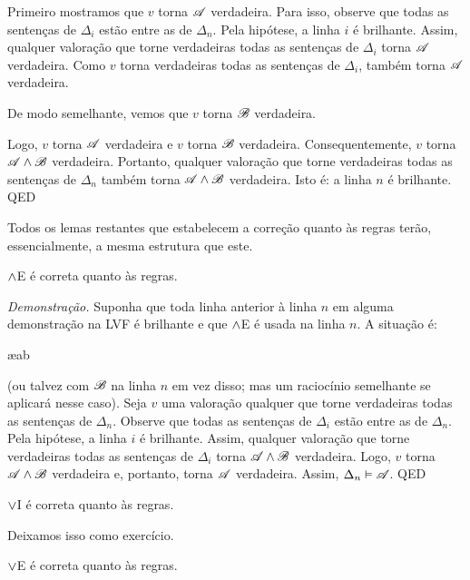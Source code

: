 Primeiro mostramos que $v$ torna $\mathscr{A}$ verdadeira. Para isso, observe que todas as sentenças de $\Delta_i$ estão entre as de $\Delta_n$. Pela hipótese, a linha $i$ é brilhante. Assim, qualquer valoração que torne verdadeiras todas as sentenças de $\Delta_i$ torna $\mathscr{A}$ verdadeira. Como $v$ torna verdadeiras todas as sentenças de $\Delta_i$, também torna $\mathscr{A}$ verdadeira.

De modo semelhante, vemos que $v$ torna $\mathscr{B}$ verdadeira.

Logo, $v$ torna $\mathscr{A}$ verdadeira e $v$ torna $\mathscr{B}$ verdadeira. Consequentemente, $v$ torna $\mathscr{A}\wedge\mathscr{B}$ verdadeira. Portanto, qualquer valoração que torne verdadeiras todas as sentenças de $\Delta_n$ também torna $\mathscr{A} \wedge \mathscr{B}$ verdadeira. Isto é: a linha $n$ é brilhante. QED


Todos os lemas restantes que estabelecem a correção quanto às regras terão, essencialmente, a mesma estrutura que este.

\begin{factoidboxe}$\wedge$E é correta quanto às regras.
\end{factoidboxe}

\emph{Demonstração.}
	Suponha que toda linha anterior à linha $n$ em alguma demonstração na LVF é brilhante e que $\wedge$E é usada na linha $n$. A situação é:
		   \begin{fitchproof}
			    \ae{ab}
		   \end{fitchproof}\noindent
(ou talvez com $\mathscr{B}$ na linha $n$ em vez disso; mas um raciocínio semelhante se aplicará nesse caso). Seja $v$ uma valoração qualquer que torne verdadeiras todas as sentenças de $\Delta_n$. Observe que todas as sentenças de $\Delta_i$ estão entre as de $\Delta_n$. Pela hipótese, a linha $i$ é brilhante. Assim, qualquer valoração que torne verdadeiras todas as sentenças de $\Delta_i$ torna $\mathscr{A}\wedge\mathscr{B}$ verdadeira. Logo, $v$ torna $\mathscr{A}\wedge\mathscr{B}$ verdadeira e, portanto, torna $\mathscr{A}$ verdadeira. Assim, $\Delta_n \vDash \mathscr{A}$. QED


\begin{factoidboxe}$\vee$I é correta quanto às regras.
\end{factoidboxe}

Deixamos isso como exercício.

\begin{factoidboxe}$\vee$E é correta quanto às regras.
\end{factoidboxe}

